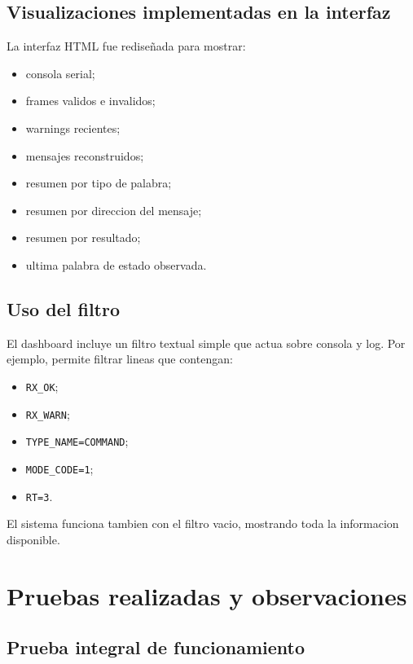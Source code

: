 \documentclass[12pt,a4paper]{article}
\begin{document}
\subsection{Visualizaciones implementadas en la interfaz}

La interfaz HTML fue redise\~nada para mostrar:

\begin{itemize}
    \item consola serial;
    \item frames validos e invalidos;
    \item warnings recientes;
    \item mensajes reconstruidos;
    \item resumen por tipo de palabra;
    \item resumen por direccion del mensaje;
    \item resumen por resultado;
    \item ultima palabra de estado observada.
\end{itemize}

\subsection{Uso del filtro}

El dashboard incluye un filtro textual simple que actua sobre consola y log. Por ejemplo, permite
filtrar lineas que contengan:

\begin{itemize}
    \item \texttt{RX\_OK};
    \item \texttt{RX\_WARN};
    \item \texttt{TYPE\_NAME=COMMAND};
    \item \texttt{MODE\_CODE=1};
    \item \texttt{RT=3}.
\end{itemize}

El sistema funciona tambien con el filtro vacio, mostrando toda la informacion disponible.

\section{Pruebas realizadas y observaciones}

\subsection{Prueba integral de funcionamiento}
\end{document}
